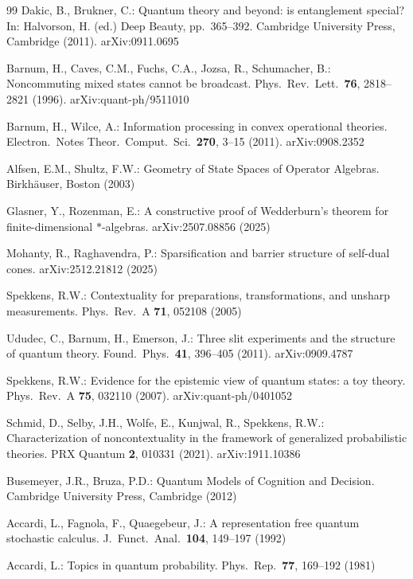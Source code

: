 \documentclass[11pt]{article}
\theoremstyle{remark}
\begin{document}
\begin{thebibliography}{99}
 Dakic, B., Brukner, C.: Quantum theory and beyond: is entanglement special? In: Halvorson, H. (ed.) Deep Beauty, pp.\ 365--392. Cambridge University Press, Cambridge (2011). arXiv:0911.0695

 Barnum, H., Caves, C.M., Fuchs, C.A., Jozsa, R., Schumacher, B.: Noncommuting mixed states cannot be broadcast. Phys.\ Rev.\ Lett.\ \textbf{76}, 2818--2821 (1996). arXiv:quant-ph/9511010

 Barnum, H., Wilce, A.: Information processing in convex operational theories. Electron.\ Notes Theor.\ Comput.\ Sci.\ \textbf{270}, 3--15 (2011). arXiv:0908.2352

 Alfsen, E.M., Shultz, F.W.: Geometry of State Spaces of Operator Algebras. Birkh\"auser, Boston (2003)

 Glasner, Y., Rozenman, E.: A constructive proof of Wedderburn's theorem for finite-dimensional $*$-algebras. arXiv:2507.08856 (2025)

 Mohanty, R., Raghavendra, P.: Sparsification and barrier structure of self-dual cones. arXiv:2512.21812 (2025)

 Spekkens, R.W.: Contextuality for preparations, transformations, and unsharp measurements. Phys.\ Rev.\ A \textbf{71}, 052108 (2005)

 Ududec, C., Barnum, H., Emerson, J.: Three slit experiments and the structure of quantum theory. Found.\ Phys.\ \textbf{41}, 396--405 (2011). arXiv:0909.4787

 Spekkens, R.W.: Evidence for the epistemic view of quantum states: a toy theory. Phys.\ Rev.\ A \textbf{75}, 032110 (2007). arXiv:quant-ph/0401052

 Schmid, D., Selby, J.H., Wolfe, E., Kunjwal, R., Spekkens, R.W.: Characterization of noncontextuality in the framework of generalized probabilistic theories. PRX Quantum \textbf{2}, 010331 (2021). arXiv:1911.10386

 Busemeyer, J.R., Bruza, P.D.: Quantum Models of Cognition and Decision. Cambridge University Press, Cambridge (2012)

 Accardi, L., Fagnola, F., Quaegebeur, J.: A representation free quantum stochastic calculus. J.\ Funct.\ Anal.\ \textbf{104}, 149--197 (1992)

 Accardi, L.: Topics in quantum probability. Phys.\ Rep.\ \textbf{77}, 169--192 (1981)


\end{thebibliography}
\end{document}
